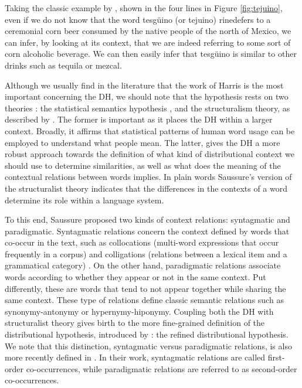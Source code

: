 Taking the classic example by \cite{nida1979componential}, shown in the four lines  in Figure \ref{fig:tejuino}, even if we do not know that the word tesg\"{u}ino (or tejuino) rinedefers to a ceremonial corn beer consumed by the native people of the north of Mexico, we can infer, by looking at its context, that we are indeed referring to some sort of corn alcoholic beverage. We can then easily infer that tesg\"{u}ino is similar to other drinks such as tequila or mezcal.



Although we usually find in the literature that the work of Harris is the most important concerning the DH, we should note that the hypothesis rests on two theories  \cite{sahlgren2008distributional,turney2010}: the statistical semantics hypothesis \cite{booth1955machine}, and the  structuralism theory, as described by \cite{de1916course}. The former is important as it places the DH within a larger context. Broadly, it affirms that statistical patterns of human word usage can be employed to understand what people mean. The latter,  gives the DH a more robust approach towards the definition of what kind of distributional context  we should use to determine similarities, as well as what does the meaning of the contextual relations between words implies. In plain words Saussure's version of the structuralist theory indicates that the differences in the contexts of a word determine its role within a language system. 

To this end, Saussure proposed two kinds of context relations: syntagmatic and paradigmatic. Syntagmatic relations concern the context defined by words that co-occur in the text, such as collocations (multi-word expressions that occur frequently in a corpus) and colligations (relations between a lexical item and a grammatical category) \cite{verschueren2015handbook}. On the other hand, paradigmatic relations associate words according to whether they appear or not in the same context. Put differently, these are words that tend to not appear together while sharing the same context. These type of relations define classic semantic relations such as synonymy-antonymy or hypernymy-hiponymy. Coupling both the DH with structuralist theory gives birth to the more fine-grained definition of the distributional hypothesis, introduced by \cite{sahlgren2008distributional}: the refined distributional hypothesis. We note that this distinction, syntagmatic versus paradigmatic relations, is also more recently defined in \cite{schutze1993vector}. In their work, syntagmatic relations are called first-order co-occurrences, while paradigmatic relations  are referred to as second-order co-occurrences.

